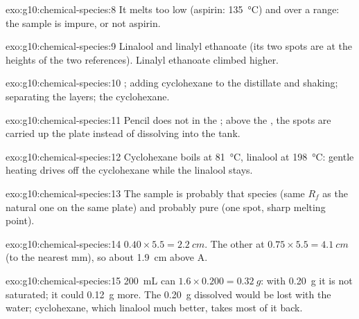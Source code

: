 \begin{solution}{exo:g10:chemical-species:8}
It melts too low (aspirin: \qty{135}{\celsius}) and over a range: the
sample is impure, or not aspirin.
\end{solution}

\begin{solution}{exo:g10:chemical-species:9}
Linalool and linalyl ethanoate (its two spots are at the heights of the
two references). Linalyl ethanoate climbed higher.
\end{solution}

\begin{solution}{exo:g10:chemical-species:10}
; adding cyclohexane to the distillate and shaking;
separating the layers;  the cyclohexane.
\end{solution}

\begin{solution}{exo:g10:chemical-species:11}
Pencil does not  in the ; above the , the spots are
carried up the plate instead of dissolving into the tank.
\end{solution}

\begin{solution}{exo:g10:chemical-species:12}
Cyclohexane boils at \qty{81}{\celsius}, linalool at \qty{198}{\celsius}:
gentle heating drives off the cyclohexane while the linalool stays.
\end{solution}

\begin{solution}{exo:g10:chemical-species:13}
The sample is probably that species (same $R_f$ as the natural one on
the same plate) and probably pure (one spot, sharp melting point).
\end{solution}

\begin{solution}{exo:g10:chemical-species:14}
$0.40 \times 5.5 = \qty{2.2}{cm}$. The other at $0.75 \times 5.5 =
\qty{4.1}{cm}$ (to the nearest mm), so about \qty{1.9}{cm} above A.
\end{solution}

\begin{solution}{exo:g10:chemical-species:15}
\qty{200}{mL} can  $1.6 \times 0.200 = \qty{0.32}{g}$: with
\qty{0.20}{g} it is not saturated; it could  \qty{0.12}{g} more.
The \qty{0.20}{g} dissolved would be lost with the water; cyclohexane,
which  linalool much better, takes most of it back.
\end{solution}

